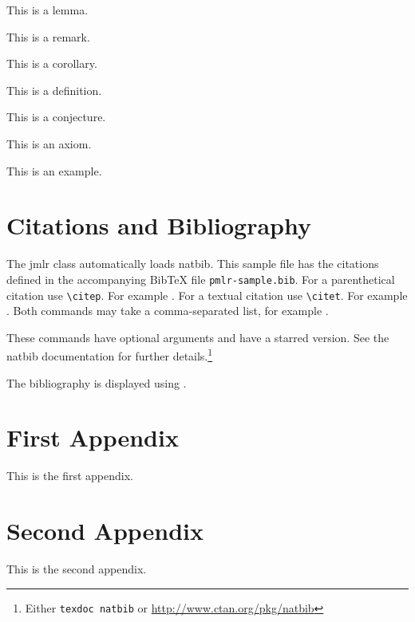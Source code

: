 \documentclass[mlmain]{jmlr}
\begin{document}
\begin{lemma}\label{lem:sample}
This is a lemma.
\end{lemma}

\begin{remark}\label{rem:sample}
This is a remark.
\end{remark}

\begin{corollary}\label{cor:sample}
This is a corollary.
\end{corollary}

\begin{definition}\label{def:sample}
This is a definition.
\end{definition}

\begin{conjecture}\label{con:sample}
This is a conjecture.
\end{conjecture}

\begin{axiom}\label{ax:sample}
This is an axiom.
\end{axiom}

\begin{example}[An Example]\label{ex:sample}
This is an example.
\end{example}

\section{Citations and Bibliography}
\label{sec:cite}

The \textsf{jmlr} class automatically loads \textsf{natbib}.
This sample file has the citations defined in the accompanying
BibTeX file \texttt{pmlr-sample.bib}. For a parenthetical
citation use \verb|\citep|. For example
\citep{guyon-elisseeff-03}. For a textual citation use
\verb|\citet|. For example \citet{guyon2007causalreport}.
Both commands may take a comma-separated list, for example
\citet{guyon-elisseeff-03,guyon2007causalreport}.

These commands have optional arguments and have a starred
version. See the \textsf{natbib} documentation for further
details.\footnote{Either \texttt{texdoc natbib} or
\url{http://www.ctan.org/pkg/natbib}}

The bibliography is displayed using \verb||.




\appendix

\section{First Appendix}\label{apd:first}

This is the first appendix.

\section{Second Appendix}\label{apd:second}

This is the second appendix.
\end{document}
